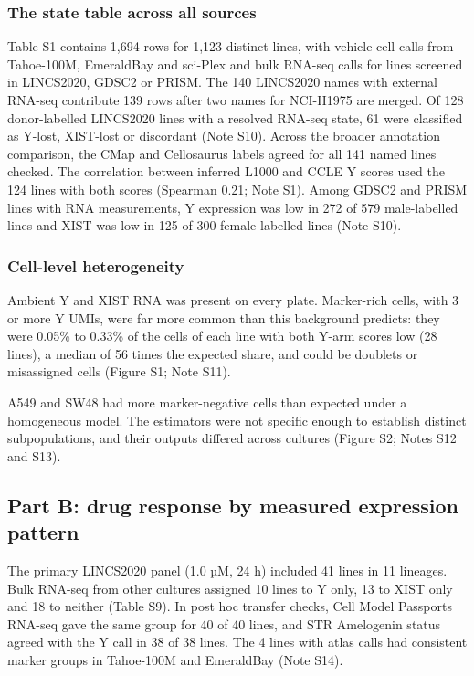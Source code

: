 \documentclass[
  11pt,
  letterpaper,
]{article}
\begin{document}
\subsubsection{The state table across all
sources}\label{the-state-table-across-all-sources}

Table S1 contains 1,694 rows for 1,123 distinct lines, with vehicle-cell
calls from Tahoe-100M, EmeraldBay and sci-Plex and bulk RNA-seq calls
for lines screened in LINCS2020, GDSC2 or PRISM. The 140 LINCS2020 names
with external RNA-seq contribute 139 rows after two names for NCI-H1975
are merged. Of 128 donor-labelled LINCS2020 lines with a resolved RNA-seq
state, 61 were classified as Y-lost, XIST-lost or discordant (Note S10). Across the broader annotation comparison, the CMap and
Cellosaurus labels agreed for all 141 named lines checked. The
correlation between inferred L1000 and CCLE Y scores used the 124 lines
with both scores (Spearman 0.21; Note S1). Among GDSC2 and PRISM lines with RNA measurements,
Y expression was low in 272 of 579 male-labelled lines and XIST was low
in 125 of 300 female-labelled lines (Note S10).

\subsubsection{Cell-level heterogeneity}\label{cell-level-heterogeneity}

Ambient Y and XIST RNA was present on every plate. Marker-rich cells,
with 3 or more Y UMIs, were far more common than this background
predicts: they were 0.05\% to 0.33\% of the cells of each line with both
Y-arm scores low (28 lines), a median of 56 times the expected share,
and could be doublets or misassigned cells (Figure S1; Note S11).

A549 and SW48 had more marker-negative cells than expected under a
homogeneous model. The estimators were not specific enough to establish
distinct subpopulations, and their outputs differed across cultures
(Figure S2; Notes S12 and S13).

\subsection{Part B: drug response by measured expression
pattern}\label{part-b-drug-response-by-measured-expression-pattern}

The primary LINCS2020 panel (1.0 µM, 24 h) included 41 lines in 11
lineages. Bulk RNA-seq from other cultures assigned 10 lines to Y only,
13 to XIST only and 18 to neither (Table S9). In post hoc transfer
checks, Cell Model Passports RNA-seq gave the same group for 40 of 40
lines, and STR Amelogenin status agreed with the Y call in 38 of 38
lines. The 4 lines with atlas calls had consistent marker groups in
Tahoe-100M and EmeraldBay (Note S14).
\end{document}
